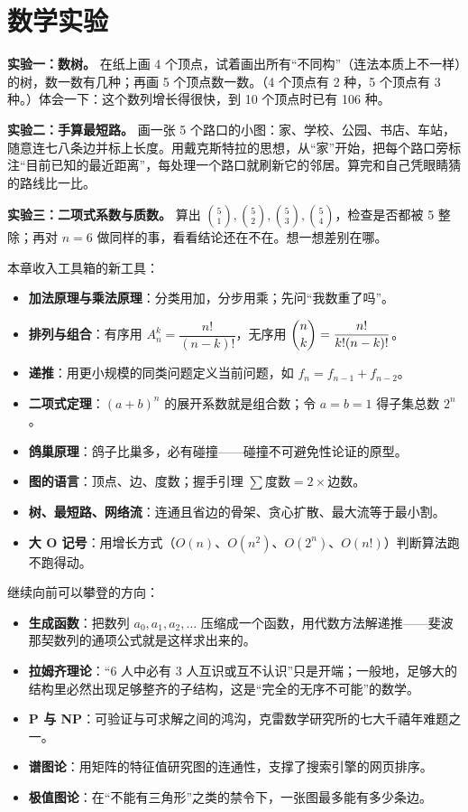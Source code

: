 \section{数学实验}

\begin{shiyan}
\textbf{实验一：数树。} 在纸上画 4 个顶点，试着画出所有“不同构”（连法本质上不一样）的树，数一数有几种；再画 5 个顶点数一数。（4 个顶点有 2 种，5 个顶点有 3 种。）体会一下：这个数列增长得很快，到 10 个顶点时已有 106 种。

\textbf{实验二：手算最短路。} 画一张 5 个路口的小图：家、学校、公园、书店、车站，随意连七八条边并标上长度。用戴克斯特拉的思想，从“家”开始，把每个路口旁标注“目前已知的最近距离”，每处理一个路口就刷新它的邻居。算完和自己凭眼睛猜的路线比一比。

\textbf{实验三：二项式系数与质数。} 算出 $\binom{5}{1},\binom{5}{2},\binom{5}{3},\binom{5}{4}$，检查是否都被 5 整除；再对 $n=6$ 做同样的事，看看结论还在不在。想一想差别在哪。
\end{shiyan}

\begin{toolbox}
本章收入工具箱的新工具：
\begin{itemize}
\item \textbf{加法原理与乘法原理}：分类用加，分步用乘；先问“我数重了吗”。
\item \textbf{排列与组合}：有序用 $A_n^k=\dfrac{n!}{(n-k)!}$，无序用 $\dbinom{n}{k}=\dfrac{n!}{k!(n-k)!}$。
\item \textbf{递推}：用更小规模的同类问题定义当前问题，如 $f_n=f_{n-1}+f_{n-2}$。
\item \textbf{二项式定理}：$(a+b)^n$ 的展开系数就是组合数；令 $a=b=1$ 得子集总数 $2^n$。
\item \textbf{鸽巢原理}：鸽子比巢多，必有碰撞——碰撞不可避免性论证的原型。
\item \textbf{图的语言}：顶点、边、度数；握手引理 $\sum\text{度数}=2\times\text{边数}$。
\item \textbf{树、最短路、网络流}：连通且省边的骨架、贪心扩散、最大流等于最小割。
\item \textbf{大 O 记号}：用增长方式（$O(n)$、$O(n^2)$、$O(2^n)$、$O(n!)$）判断算法跑不跑得动。
\end{itemize}
\end{toolbox}

\begin{pandeng}
继续向前可以攀登的方向：
\begin{itemize}
\item \textbf{生成函数}：把数列 $a_0,a_1,a_2,\dots$ 压缩成一个函数，用代数方法解递推——斐波那契数列的通项公式就是这样求出来的。
\item \textbf{拉姆齐理论}：“6 人中必有 3 人互识或互不认识”只是开端；一般地，足够大的结构里必然出现足够整齐的子结构，这是“完全的无序不可能”的数学。
\item \textbf{P 与 NP}：可验证与可求解之间的鸿沟，克雷数学研究所的七大千禧年难题之一。
\item \textbf{谱图论}：用矩阵的特征值研究图的连通性，支撑了搜索引擎的网页排序。
\item \textbf{极值图论}：在“不能有三角形”之类的禁令下，一张图最多能有多少条边。
\end{itemize}
\end{pandeng}

